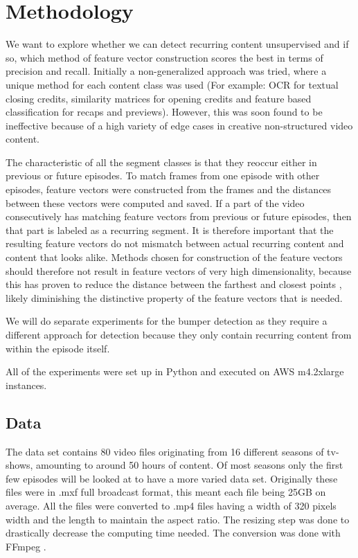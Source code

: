 \documentclass{article}
\begin{document}
\section{Methodology} \label{methodology}
We want to explore whether we can detect recurring content unsupervised and if so, which method of feature vector construction scores the best in terms of precision and recall. Initially a non-generalized approach was tried, where a unique method for each content class was used (For example: OCR for textual closing credits, similarity matrices for opening credits and feature based classification for recaps and previews). However, this was soon found to be ineffective because of a high variety of edge cases in creative non-structured video content. 

The characteristic of all the segment classes is that they reoccur either in previous or future episodes. To match frames from one episode with other episodes, feature vectors were constructed from the frames and the distances between these vectors were computed and saved. If a part of the video consecutively has matching feature vectors from previous or future episodes, then that part is labeled as a recurring segment. It is therefore important that the resulting feature vectors do not mismatch between actual recurring content and content that looks alike. Methods chosen for construction of the feature vectors should therefore not result in feature vectors of very high dimensionality, because this has proven to reduce the distance between the farthest and closest points \cite{beyer1999nearest}, likely diminishing the distinctive property of the feature vectors that is needed.

We will do separate experiments for the bumper detection as they require a different approach for detection because they only contain recurring content from within the episode itself.

All of the experiments were set up in Python and executed on AWS m4.2xlarge instances.

\subsection{Data}
The data set contains 80 video files originating from 16 different seasons of tv-shows, amounting to around 50 hours of content. Of most seasons only the first few episodes will be looked at to have a more varied data set. Originally these files were in .mxf full broadcast format, this meant each file being 25GB on average. All the files were converted to .mp4 files having a width of 320 pixels width and the length to maintain the aspect ratio. The resizing step was done to drastically decrease the computing time needed. The conversion was done with FFmpeg \cite{ffmpeg}.
\end{document}
